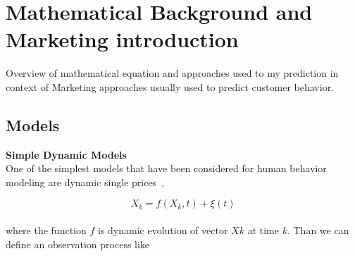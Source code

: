 \section{Mathematical Background and Marketing introduction} \label{sec:introduction}
Overview of mathematical equation and approaches used to my prediction in context of Marketing approaches usually used to predict customer behavior.\\
\subsection{Models} \label{subsec:models}
\textbf{Simple Dynamic Models} \label{subsec:simpleDynamicModels}\\
One of the simplest models that have been considered for human behavior modeling are dynamic single prices~\cite{pantland},

\begin{equation} \label{eq:1}
X_k = f(X_k, t) + \xi(t)
\end{equation}
\\
where the function $f$ is dynamic evolution of vector $Xk$ at time $k$.
Than we can define an observation process like~\cite{pantland}

